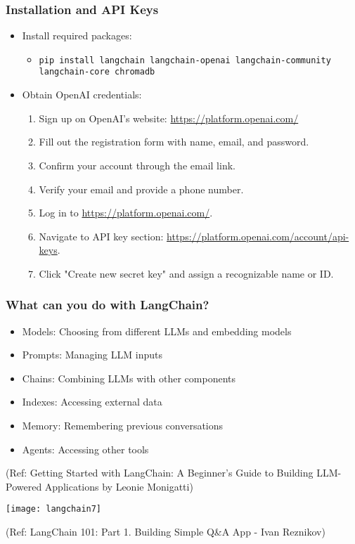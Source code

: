 \begin{frame}
\frametitle{Installation and API Keys}

\begin{itemize}
    \item Install required packages:
    \begin{itemize}
        \item \texttt{pip install langchain langchain-openai langchain-community langchain-core chromadb}
    \end{itemize}
    \item Obtain OpenAI credentials:
    \begin{enumerate}
        \item Sign up on OpenAI's website: \url{https://platform.openai.com/}
        \item Fill out the registration form with name, email, and password.
        \item Confirm your account through the email link.
        \item Verify your email and provide a phone number.
        \item Log in to \url{https://platform.openai.com/}.
        \item Navigate to API key section: \url{https://platform.openai.com/account/api-keys}.
        \item Click "Create new secret key" and assign a recognizable name or ID.
    \end{enumerate}
\end{itemize}

\end{frame}


\begin{frame}[fragile]\frametitle{What can you do with LangChain?}

\begin{itemize}
\item Models: Choosing from different LLMs and embedding models
\item Prompts: Managing LLM inputs
\item Chains: Combining LLMs with other components
\item Indexes: Accessing external data
\item Memory: Remembering previous conversations
\item Agents: Accessing other tools
\end{itemize}

{\tiny (Ref: Getting Started with LangChain: A Beginner’s Guide to Building LLM-Powered Applications by Leonie Monigatti)}

\begin{center}
\texttt{[image: langchain7]}
\end{center}	  


{\tiny (Ref: LangChain 101: Part 1. Building Simple Q\&A App - Ivan Reznikov)}
\end{frame}


